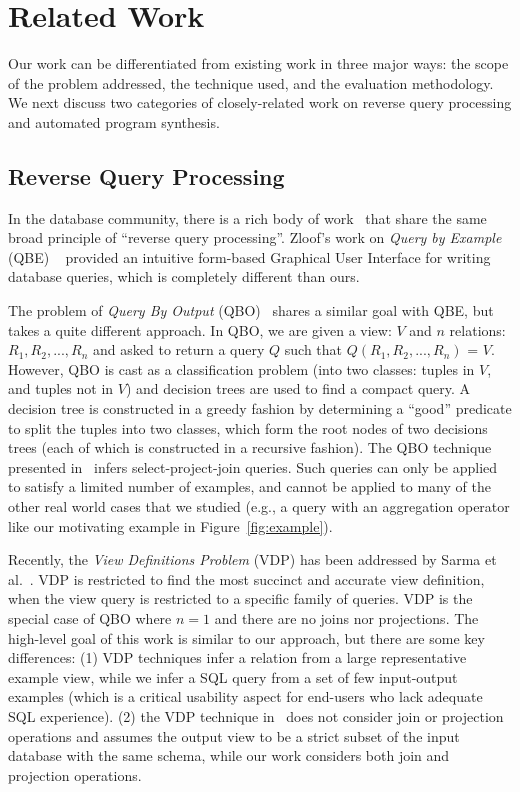 
\section{Related Work}
\label{sec:related}

Our work can be differentiated from existing work in three major ways: the scope
of the problem addressed, the technique used, and the evaluation methodology.
We next discuss two categories of closely-related work on reverse query processing
and automated program synthesis.


\subsection{Reverse Query Processing}

In the database community, there is a rich body of
work~\cite{Zloof:1975, Tran:2009, DasSarma:2010} that share the same broad principle
of ``reverse query processing''. Zloof's work on \textit{Query by Example} (QBE)
~\cite{Zloof:1975} provided an intuitive form-based Graphical User Interface for
writing database queries, which is completely different than ours.

The problem of \textit{Query By Output} (QBO)~\cite{Tran:2009} shares a similar
goal with QBE, but takes a quite different approach.
In QBO, we are given a view: $V$ and $n$ relations: $R_1, R_2, ..., R_n$ and asked to
return a query $Q$ such that $Q(R_1, R_2, ..., R_n)$ = $V$. However, QBO is cast as
a classification problem (into two classes: tuples in $V$, and tuples not in $V$)
and decision trees are used to find a compact query. A decision tree is constructed
in a greedy fashion by determining a ``good'' predicate to split the tuples into two
classes, which form the root nodes of two decisions trees (each of which is
constructed in a recursive fashion).  The QBO technique presented in~\cite{Tran:2009}
infers select-project-join queries. Such queries can only be applied to
satisfy a limited number of examples, and cannot be applied to many of the other
real world cases that we studied (e.g., a query with an aggregation operator
like our motivating example in Figure~\ref{fig:example}).

Recently, the \textit{View Definitions Problem} (VDP) has been addressed
by Sarma et al.~\cite{DasSarma:2010}.
VDP is restricted to find the most succinct and accurate view definition, when
the view query is restricted to a specific family of queries. VDP is the special
case of QBO where $n = 1$ and there are no joins nor projections.
The high-level goal of this work is similar to our approach, but there
are some key differences: (1) VDP techniques infer a relation from a large representative
example view, while we infer a SQL query from a set of few input-output examples
(which is a critical usability aspect for end-users who lack adequate
SQL experience). (2) the VDP technique in~\cite{DasSarma:2010} does
not consider join or projection
operations and assumes the output view to be a strict subset of the input
database with the same schema, while our work considers both join and
projection operations.



